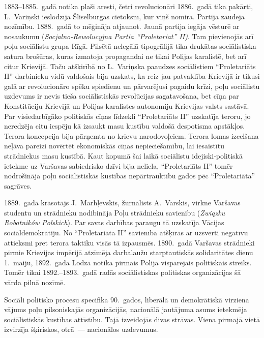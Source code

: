 \documentclass[twoside,a5paper,12pt,fleqn,openany]{extbook}
\newcommand{\pltxti}[1]{\textit{\textpolish{#1}}}
\begin{document}
1883--1885.~gadā notika plaši aresti, četri revolucionāri 1886.~gadā tika pakārti, L.~Variņski ieslodzīja Šliselburgas cietoksnī, kur viņš nomira. Partija zaudēja nozīmību. 1888.~gadā to mēģināja atjaunot. Jaunā partija iegāja vēsturē ar nosaukumu  (\pltxti{Socjalno-Rewolucyjna Partia ``Proletariat'' II)}. Tam pievienojās arī poļu sociālistu grupa Rīgā. Pilsētā nelegālā tipogrāfijā tika drukātas sociālistiska satura brošūras, kuras izmatoja propagandai ne tikai Polijas karalistē, bet arī citur Krievijā. Taču atšķirībā no L.~Variņska paaudzes sociālistiem ``Proletariāts II'' darbinieku vidū valdošais bija uzskats, ka reiz jau patvaldība Krievijā ir tikusi galā ar revolucionāro spēku spiedienu un pārvarējusi pagaidu krīzi, poļu sociālistu uzdevums ir nevis tieša sociālistiskās revolūcijas sagatavošana, bet cīņa par Konstitūciju Krievijā un Polijas karalistes autonomiju Krievijas valsts sastāvā. Par visiedarbīgāko politiskās cīņas līdzekli ``Proletariāts II'' uzskatīja teroru, jo neredzēja citu iespēju kā izsaukt masu kustību valdošā despotisma apstākļos. Terora koncepcija bija pārņemta no krievu narodovoļciem. Terora lomas izcelšana neļāva pareizi novērtēt ekonomiskās cīņas nepieciešamību, lai iesaistītu strādniekus masu kustībā. Kaut kopumā šai laikā sociālistu idejiski-politiskā ietekme uz Varšavas sabiedrisko dzīvi bija neliela, ``Proletariāts II'' tomēr nodrošināja poļu sociālistiskās kustības nepārtrauktību gados pēc ``Proletariāta'' sagrāves.

1889.~gadā krāsotājs J.~Marhļevskis, žurnālists Ā.~Varskis, virkne Varšavas studentu un strādnieku nodibināja Poļu strādnieku savienību (\pltxti{Związku Robotników Polskich}). Par savas darbības paraugu tā uzskatīja Vācijas sociāldemokrātiju. No ``Proletariāta II'' savienība atšķīrās ar uzsvērti negatīvu attieksmi pret terora taktiku visās tā izpausmēs. 1890.~gadā Varšavas strādnieki pirmie Krievijas impērijā atzīmēja darbaļaužu starptautiskās solidaritātes dienu 1.~maiju, 1892.~gadā Lodzā notika pirmais Polijā vispārējais politiskais streiks. Tomēr tikai 1892.--1893.~gadā radās sociālistiskas politiskas organizācijas šā vārda pilnā nozīmē.

Sociāli politisko procesu specifika 90.~gados, liberālā un demokrātiskā virziena vājums poļu pilsoniskajās organizācijās, nacionālā jautājuma asums ietekmēja sociālistiskās kustības attīstību. Tajā izveidojās divas strāvas. Viena pirmajā vietā izvirzīja šķiriskos, otrā~--- nacionālos uzdevumus.
\end{document}
